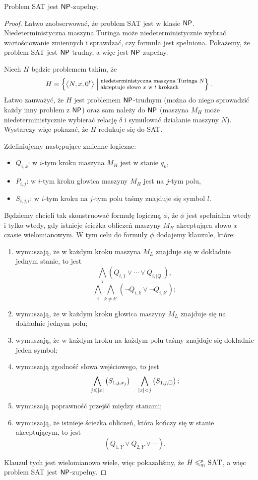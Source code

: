 \begin{theorem}\label{t:Cook-Levin}
    Problem SAT jest $\NPclass$-zupełny.
\end{theorem}
\begin{proof}
    Łatwo zaobserwować, że problem SAT jest w klasie $\NPclass$. Niedeterministyczna maszyna Turinga może niedeterministycznie wybrać wartościowanie zmiennych i sprawdzać, czy formuła jest spełniona. Pokażemy, że problem SAT jest $\NPclass$-trudny, a więc jest $\NPclass$-zupełny.

    Niech $H$ będzie problemem takim, że
    \[ H = \left\{\encode{N, x, 0^t} \Bigm| \parbox{15em}{\footnotesize niedeterministyczna maszyna Turinga $N$ akceptuje słowo $x$ w $t$ krokach}\right\}. \]
    Łatwo zauważyć, że $H$ jest problemem $\NPclass$-trudnym (można do niego sprowadzić każdy inny problem z $\NPclass$) oraz sam należy do $\NPclass$ (maszyna $M_H$ może niedeterministycznie wybierać relację $\delta$ i symulować działanie maszyny $N$).
    Wystarczy więc pokazać, że $H$ redukuje się do SAT.

    Zdefiniujemy następujące zmienne logiczne:
    \begin{itemize}
        \item $Q_{i, k}$: w $i$-tym kroku maszyna $M_H$ jest w stanie $q_k$,
        \item $P_{i, j}$: w $i$-tym kroku głowica maszyny $M_H$ jest na $j$-tym polu,
        \item $S_{i, j, l}$: w $i$-tym kroku na $j$-tym polu taśmy znajduje się symbol $l$.
    \end{itemize}
    Będziemy chcieli tak skonstruować formułę logiczną $\phi$, że $\phi$ jest spełnialna wtedy i tylko wtedy, gdy istnieje ścieżka obliczeń maszyny $M_H$ akceptująca słowo $x$ czasie wielomianowym. W tym celu do formuły $\phi$ dodajemy klauzule, które:
    \begin{enumerate}
        \item wymuszają, że w każdym kroku maszyna $M_L$ znajduje się w dokładnie jednym stanie, to jest
        \[ \bigwedge_i \left(Q_{i, 1} \lor \cdots \lor Q_{i, |Q|}\right), \]
        \[ \bigwedge_i \bigwedge_{k \neq k'} \left(\neg Q_{i, k} \lor \neg Q_{i, k'}\right); \]
        \item wymuszają, że w każdym kroku głowica maszyny $M_L$ znajduje się na dokładnie jednym polu;
        \item wymuszają, że w każdym kroku na każdym polu taśmy znajduje się dokładnie jeden symbol;
        \item wymuszają zgodność słowa wejściowego, to jest
        \[ \bigwedge_{j \leq |x|} \left(S_{1, j, x_j}\right) \quad \bigwedge_{|x| < j} \left(S_{1, j, \blank}\right); \]
        \item wymuszają poprawność przejść między stanami;
        \item wymuszają, że istnieje ścieżka obliczeń, która kończy się w stanie akceptującym, to jest
        \[ \left( Q_{1, Y} \lor Q_{2, Y} \lor \cdots \right). \]
    \end{enumerate}
    Klauzul tych jest wielomianowo wiele, więc pokazaliśmy, że $H \leq_m^p \textsc{SAT}$, a więc problem SAT jest $\NPclass$-zupełny.
\end{proof}

